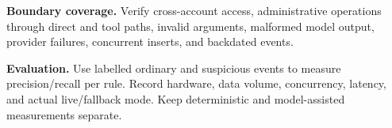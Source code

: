 \noindent\textbf{Boundary coverage.} Verify cross-account access, administrative operations through direct and tool paths, invalid arguments, malformed model output, provider failures, concurrent inserts, and backdated events.

\noindent\textbf{Evaluation.} Use labelled ordinary and suspicious events to measure precision/recall per rule. Record hardware, data volume, concurrency, latency, and actual live/fallback mode. Keep deterministic and model-assisted measurements separate.
